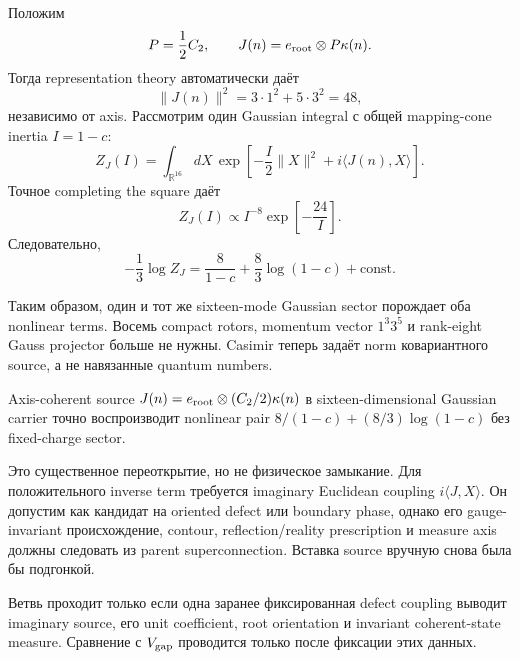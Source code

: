 Положим
\begin{equation}
 P=\frac12C_2,
 \qquad
 J(n)=e_{\rm root}\otimes P\kappa(n).
\end{equation}
Тогда representation theory автоматически даёт
\begin{equation}
 \|J(n)\|^2
 =3\cdot1^2+5\cdot3^2
 =48,
\end{equation}
независимо от axis. Рассмотрим один Gaussian integral с общей mapping-cone
inertia $I=1-c$:
\begin{equation}
 Z_J(I)=\int_{\mathbb R^{16}}dX\,
 \exp\left[-\frac I2\|X\|^2+i\langle J(n),X\rangle\right].
\end{equation}
Точное completing the square даёт
\begin{equation}
 Z_J(I)\propto I^{-8}\exp\left[-\frac{24}{I}\right].
\end{equation}
Следовательно,
\begin{equation}
 -\frac13\log Z_J
 =\frac8{1-c}+\frac83\log(1-c)+\text{const}.
\end{equation}

Таким образом, один и тот же sixteen-mode Gaussian sector порождает оба
nonlinear terms. Восемь compact rotors, momentum vector $1^3 3^5$ и
rank-eight Gauss projector больше не нужны. Casimir теперь задаёт norm
ковариантного source, а не навязанные quantum numbers.

\begin{proposition}
Axis-coherent source $J(n)=e_{\rm root}\otimes(C_2/2)\kappa(n)$ в
sixteen-dimensional Gaussian carrier точно воспроизводит nonlinear pair
$8/(1-c)+(8/3)\log(1-c)$ без fixed-charge sector.
\end{proposition}

Это существенное переоткрытие, но не физическое замыкание. Для положительного
inverse term требуется imaginary Euclidean coupling
$i\langle J,X\rangle$. Он допустим как кандидат на oriented defect или
boundary phase, однако его gauge-invariant происхождение, contour,
reflection/reality prescription и measure axis должны следовать из parent
superconnection. Вставка source вручную снова была бы подгонкой.

\begin{nogocriterion}
Ветвь проходит только если одна заранее фиксированная defect coupling выводит
imaginary source, его unit coefficient, root orientation и invariant
coherent-state measure. Сравнение с $V_{\rm gap}$ проводится только после
фиксации этих данных.
\end{nogocriterion}